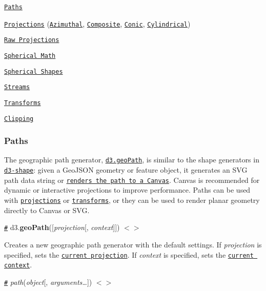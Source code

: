 \begin{DoxyItemize}
\item \href{#paths}{\tt Paths}
\item \href{#projections}{\tt Projections} (\href{#azimuthal-projections}{\tt Azimuthal}, \href{#composite-projections}{\tt Composite}, \href{#conic-projections}{\tt Conic}, \href{#cylindrical-projections}{\tt Cylindrical})
\item \href{#raw-projections}{\tt Raw Projections}
\item \href{#spherical-math}{\tt Spherical Math}
\item \href{#spherical-shapes}{\tt Spherical Shapes}
\item \href{#streams}{\tt Streams}
\item \href{#transforms}{\tt Transforms}
\item \href{#clipping}{\tt Clipping}
\end{DoxyItemize}

\subsubsection*{Paths}

The geographic path generator, \href{#geoPath}{\tt d3.\+geo\+Path}, is similar to the shape generators in \href{https://github.com/d3/d3-shape}{\tt d3-\/shape}\+: given a Geo\+J\+S\+ON geometry or feature object, it generates an S\+VG path data string or \href{https://bl.ocks.org/mbostock/3783604}{\tt renders the path to a Canvas}. Canvas is recommended for dynamic or interactive projections to improve performance. Paths can be used with \href{#projections}{\tt projections} or \href{#transforms}{\tt transforms}, or they can be used to render planar geometry directly to Canvas or S\+VG.

\href{#geoPath}{\tt \#} d3.{\bfseries geo\+Path}(\mbox{[}{\itshape projection}\mbox{[}, {\itshape context}\mbox{]}\mbox{]}) \href{https://github.com/d3/d3-geo/blob/master/src/path/index.js}{\tt $<$$>$}

Creates a new geographic path generator with the default settings. If {\itshape projection} is specified, sets the \href{#path_projection}{\tt current projection}. If {\itshape context} is specified, sets the \href{#path_context}{\tt current context}.

\href{#_path}{\tt \#} {\itshape path}({\itshape object}\mbox{[}, {\itshape arguments…}\mbox{]}) \href{https://github.com/d3/d3-geo/blob/master/src/path/index.js#L15}{\tt $<$$>$}

